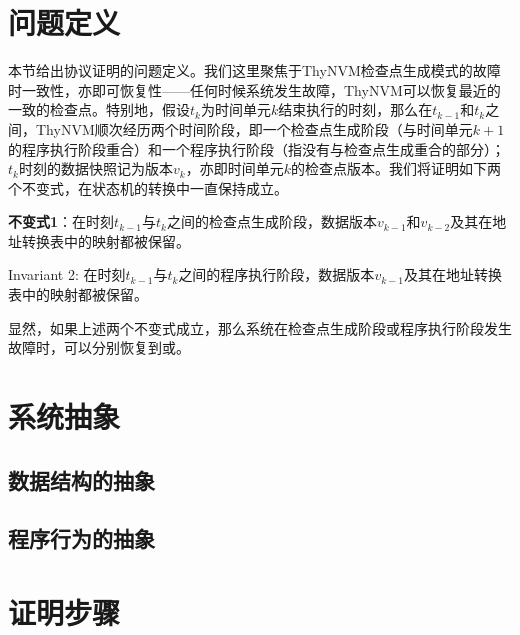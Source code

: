 \begin{itemize}
\section{问题定义}

本节给出协议证明的问题定义。我们这里聚焦于ThyNVM检查点生成模式的故障时一致性，亦即可恢复性——任何时候系统发生故障，ThyNVM可以恢复最近的一致的检查点。特别地，假设$t_k$为时间单元$k$结束执行的时刻，那么在$t_{k-1}$和$t_k$之间，ThyNVM顺次经历两个时间阶段，即一个检查点生成阶段（与时间单元$k+1$的程序执行阶段重合）和一个程序执行阶段（指没有与检查点生成重合的部分）；$t_k$时刻的数据快照记为版本$v_k$，亦即时间单元$k$的检查点版本。我们将证明如下两个不变式，在状态机的转换中一直保持成立。

\textbf{不变式1}：在时刻$t_{k-1}$与$t_k$之间的检查点生成阶段，数据版本$v_{k-1}$和$v_{k-2}$及其在地址转换表中的映射都被保留。

Invariant 2: 在时刻$t_{k-1}$与$t_k$之间的程序执行阶段，数据版本$v_{k-1}$及其在地址转换表中的映射都被保留。

显然，如果上述两个不变式成立，那么系统在检查点生成阶段或程序执行阶段发生故障时，可以分别恢复到{\cp}或{\cl}。

\section{系统抽象}

\subsection{数据结构的抽象}

\subsection{程序行为的抽象}

\section{证明步骤}

\end{itemize}

